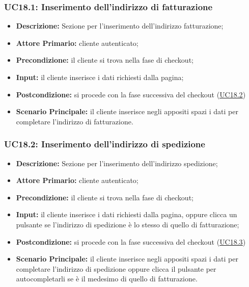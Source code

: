             \subsubsection{UC18.1: Inserimento dell'indirizzo di fatturazione}
            \label{sec:UC18.1}
                \begin{itemize}
                    \item \textbf{Descrizione:} Sezione per l'inserimento dell'indirizzo fatturazione;
                    \item \textbf{Attore Primario:} cliente autenticato;
                    \item \textbf{Precondizione:} il cliente si trova nella fase di checkout;
                    \item \textbf{Input:} il cliente inserisce i dati richiesti dalla pagina;
                    \item \textbf{Postcondizione:} si procede con la fase successiva del checkout (\hyperref[sec:UC18.2]{\underline{UC18.2}})
                    \item \textbf{Scenario Principale:} il cliente inserisce negli appositi spazi i dati per completare l'indirizzo di fatturazione.
                \end{itemize}
            \subsubsection{UC18.2: Inserimento dell'indirizzo di spedizione}
            \label{sec:UC18.2}
                \begin{itemize}
                    \item \textbf{Descrizione:} Sezione per l'inserimento dell'indirizzo spedizione;
                    \item \textbf{Attore Primario:} cliente autenticato;
                    \item \textbf{Precondizione:} il cliente si trova nella fase di checkout;
                    \item \textbf{Input:} il cliente inserisce i dati richiesti dalla pagina, oppure clicca un pulsante se l'indirizzo di spedizione è lo stesso di quello di fatturazione;
                    \item \textbf{Postcondizione:} si procede con la fase successiva del checkout (\hyperref[sec:UC18.3]{\underline{UC18.3}})
                    \item \textbf{Scenario Principale:} il cliente inserisce negli appositi spazi i dati per completare l'indirizzo di spedizione oppure clicca il pulsante per autocompletarli se è il medesimo di quello di fatturazione.
                \end{itemize}
